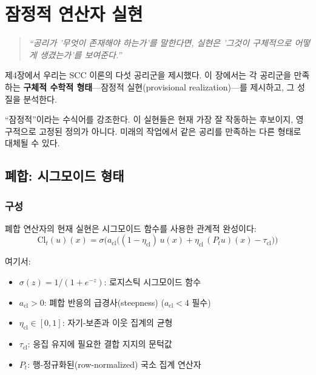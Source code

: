 
\chapter{잠정적 연산자 실현}
\label{ch:operators}

\begin{quote}
\textit{``공리가 '무엇이 존재해야 하는가'를 말한다면, 실현은 '그것이 구체적으로 어떻게 생겼는가'를 보여준다.''}
\end{quote}

제4장에서 우리는 SCC 이론의 다섯 공리군을 제시했다. 이 장에서는 각 공리군을 만족하는 \textbf{구체적 수학적 형태}---잠정적 실현(provisional realization)---를 제시하고, 그 성질을 분석한다.

``잠정적''이라는 수식어를 강조한다. 이 실현들은 현재 가장 잘 작동하는 후보이지, 영구적으로 고정된 정의가 아니다. 미래의 작업에서 같은 공리를 만족하는 다른 형태로 대체될 수 있다.


\section{폐합: 시그모이드 형태}
\label{sec:sigmoid-closure}

\subsection{구성}

폐합 연산자의 현재 실현은 시그모이드 함수를 사용한 관계적 완성이다:
\begin{equation}
    \mathrm{Cl}_t(u)(x) = \sigma\!\Big( a_{\mathrm{cl}} \big( (1 - \eta_{\mathrm{cl}})\, u(x) + \eta_{\mathrm{cl}}\, (P_t u)(x) - \tau_{\mathrm{cl}} \big) \Big)
    \label{eq:sigmoid-closure}
\end{equation}

여기서:
\begin{itemize}
    \item $\sigma(z) = 1/(1 + e^{-z})$: 로지스틱 시그모이드 함수
    \item $a_{\mathrm{cl}} > 0$: 폐합 반응의 급경사(steepness) ($a_{\mathrm{cl}} < 4$ 필수)
    \item $\eta_{\mathrm{cl}} \in [0,1]$: 자기-보존과 이웃 집계의 균형
    \item $\tau_{\mathrm{cl}}$: 응집 유지에 필요한 결합 지지의 문턱값
    \item $P_t$: 행-정규화된(row-normalized) 국소 집계 연산자
\end{itemize}

